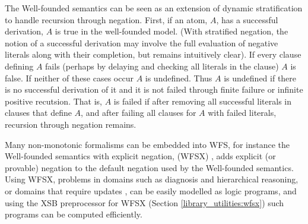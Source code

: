 The Well-founded semantics can be seen as an extension of dynamic
stratification to handle recursion through negation.  First, if an
atom, $A$, has a successful derivation, $A$ is true in the
well-founded model.  (With stratified negation, the notion of a
successful derivation may involve the full evaluation of negative
literals along with their completion, but remains intuitively clear).
If every clause defining $A$ fails (perhaps by delaying and checking
all literals in the clause) $A$ is false.  If neither of these cases
occur $A$ is undefined.  Thus $A$ is undefined if there is no
successful derivation of it and it is not failed through finite
failure or infinite positive recutsion.  That is, $A$ is failed if
after removing all successful literals in clauses that define $A$, and
after failing all clauses for $A$ with failed literals, recursion
through negation remains.

Many non-monotonic formalisms can be embedded into WFS, for instance
the Well-founded semantics with explicit negation, (WFSX)
\cite{ADP95}, adds explicit (or provable) negation to the default
negation used by the Well-founded semantics.  Using WFSX, problems in
domains such as diagnosis and hierarchical reasoning, or domains that
require updates \cite{Leit97}, can be easily modelled as logic
programs, and using the XSB preprocessor for WFSX (Section
\ref{library_utilities:wfsx}) such programs can be computed
efficiently.

